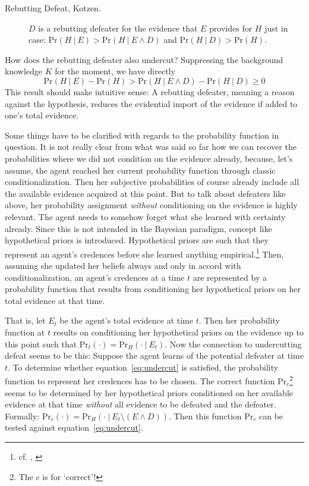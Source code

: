 \documentclass[11pt, a4paper]{scrartcl}
\newcommand{\given}[1][]{\:#1\vert\:}
\renewcommand{\Pr}{\text{Pr}}
\renewcommand{\i}[1]{\emph{#1}}
\begin{document}
\begin{description}
    \item[Rebutting Defeat, Kotzen.] $D$ is a rebutting defeater for the evidence that $E$ provides for $H$ just in case: $\Pr(H \given E) > \Pr(H \given E \land D)$ and $\Pr(H \given D) > \Pr(H)$.
\end{description}

How does the rebutting defeater also undercut? Suppressing the background knowledge $K$ for the moment, we have directly 
\[{ \Pr(H \given E) - \Pr(H)  >  \Pr(H \given E \land D) - \Pr(H\given D) \geqslant 0 }\]
This result should make intuitive sense: A rebutting defeater, meaning a reason against the hypothesis, reduces the evidential import of the evidence if added to one's total evidence.     

Some things have to be clarified with regards to the probability function in question. It is not really clear from what was said so far how we can recover the probabilities where we did not condition on the evidence already, because, let's assume, the agent reached her current probability function through classic conditionalization. Then her subjective probabilities of course already include all the available evidence acquired at this point. But to talk about defeaters like above, her probability assignment \i{without} conditioning on the evidence is highly relevant. The agent needs to somehow forget what she learned with certainty already. Since this is not intended in the Bayesian paradigm, concept like hypothetical priors is introduced. Hypothetical priors are such that they represent an agent's credences before she learned anything empirical.\footnote{cf. \textcite[Ch. 4]{Levi1980}, \textcite[110]{Titelbaum2017}} Then, assuming she updated her beliefs always and only in accord with conditionalization, an agent's credences at a time $t$ are represented by a probability function that results from conditioning her hypothetical priors on her total evidence at that time.

That is, let $E_t$ be the agent's total evidence at time $t$. Then her probability function at $t$ results on conditioning her hypothetical priors on the evidence up to this point such that $\Pr_t(\cdot) = \Pr_H(\cdot \given E_t)$. Now the connection to undercutting defeat seems to be this: Suppose the agent learns of the potential defeater at time $t$. To determine whether equation~\ref{eq:undercut} is satisfied, the probability function to represent her credences has to be chosen. The correct function $\Pr_c$\footnote{The $c$ is for `correct'!} seems to be determined by her hypothetical priors conditioned on her available evidence at that time \i{without} all evidence to be defeated and the defeater. Formally: $ \Pr_c(\cdot) = \Pr_H (\cdot \given E_t \setminus (E \land D))$. Then this function $\Pr_c$ can be tested against equation~\ref{eq:undercut}.
\end{document}
